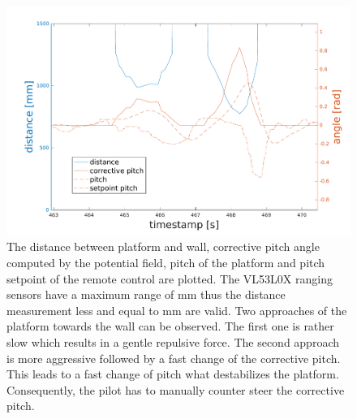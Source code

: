 \begin{figure}
	\centering
	\includegraphics[width=0.9\linewidth]{pictures/plot_pf_test.pdf}
	\caption{The distance between platform and wall, corrective pitch angle computed by the potential field, pitch of the platform and pitch setpoint of the remote control are plotted. The VL53L0X ranging sensors have a maximum range of \unit[1200]{mm} thus the distance measurement less and equal to \unit[1200]{mm} are valid. Two approaches of the platform towards the wall can be observed. The first one is rather slow which results in a gentle repulsive force. The second approach is more aggressive followed by a fast change of the corrective pitch. This leads to a fast change of pitch what destabilizes the platform.    Consequently, the pilot has to manually counter steer the corrective pitch.}
	\label{fig:pf test}
\end{figure}


